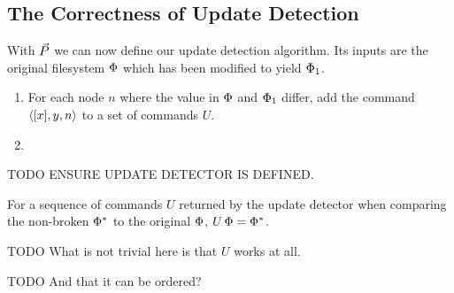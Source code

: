 
\subsection{The Correctness of Update Detection}

With $\vec{P}$ we can now define our update detection algorithm.
Its inputs are the original filesystem $\Phi$ which has been modified to yield $\Phi_1$.
\begin{mydef}
\begin{enumerate}
    \item For each node $n$ where the value in $\Phi$ and $\Phi_1$ differ, add the command $\langle{[x],y,n}\rangle$ to
        a set of commands $U$.
    \item %
\end{enumerate}
\end{mydef}


TODO ENSURE UPDATE DETECTOR IS DEFINED.




\begin{myth}
For a sequence of commands $U$ returned by the update detector
when comparing the non-broken $\Phi^*$ to the original $\Phi$,
$U\,\Phi = \Phi^*$.
\end{myth}

TODO What is not trivial here is that $U$ works at all.

TODO And that it can be ordered?

